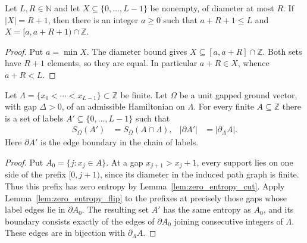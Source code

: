 \begin{lemma}
    \label{thm:chain_full_support_window}
    \leanok
    Let $L,R\in\mathbb N$ and let $X\subseteq\{0,\ldots,L-1\}$
    be nonempty, of diameter at most $R$. If $|X|=R+1$, then there
    is an integer $a\ge0$ such that $a+R+1\le L$ and
    $X=[a,a+R+1)\cap\mathbb Z$.
\end{lemma}
\begin{proof}
    \leanok
    Put $a=\min X$. The diameter bound gives
    $X\subseteq[a,a+R]\cap\mathbb Z$. Both sets have $R+1$ elements,
    so they are equal. In particular $a+R\in X$, whence $a+R<L$.
\end{proof}

\begin{lemma}
    \label{thm:domain_entropy_boundary_reduction}
    \leanok
    Let $\Lambda=\{x_0<\cdots<x_{L-1}\}\subset\mathbb Z$ be finite.
    Let $\Omega$ be a unit gapped ground vector, with gap $\Delta>0$,
    of an admissible Hamiltonian on $\Lambda$. For every finite
    $A\subseteq\mathbb Z$ there is a set of labels
    $A'\subseteq\{0,\ldots,L-1\}$ such that
    \begin{align}
        S_\Omega(A')  & =S_\Omega(A\cap\Lambda), &
        |\partial A'| & =|\partial_\Lambda A|.
        \label{eq:domain_entropy_boundary_reduction}
    \end{align}
    Here $\partial A'$ is the edge boundary in the chain of labels.
\end{lemma}
\begin{proof}
    \leanok
    Put $A_0=\{j:x_j\in A\}$. At a gap $x_{j+1}>x_j+1$, every
    support lies on one side of the prefix $[0,j+1)$, since its
    diameter in the induced path graph is finite. Thus this prefix
    has zero entropy by Lemma~\ref{lem:zero_entropy_cut}.
    Apply Lemma~\ref{lem:zero_entropy_flip} to the prefixes at precisely
    those gaps whose label edges lie in $\partial A_0$. The resulting
    set $A'$ has the same entropy as $A_0$, and its boundary consists
    exactly of the edges of $\partial A_0$ joining consecutive integers
    of $\Lambda$. These edges are in bijection with
    $\partial_\Lambda A$.
\end{proof}

